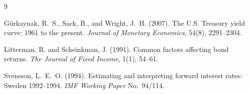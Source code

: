 \documentclass[11pt]{article}
\begin{document}
\begin{thebibliography}{9}

G\"urkaynak, R.~S., Sack, B., and Wright, J.~H. (2007).
The U.S. Treasury yield curve: 1961 to the present.
\emph{Journal of Monetary Economics}, 54(8), 2291--2304.

Litterman, R. and Scheinkman, J. (1991).
Common factors affecting bond returns.
\emph{The Journal of Fixed Income}, 1(1), 54--61.

Svensson, L.~E.~O. (1994).
Estimating and interpreting forward interest rates: Sweden 1992--1994.
\emph{IMF Working Paper} No.\ 94/114.

\end{thebibliography}
\end{document}
